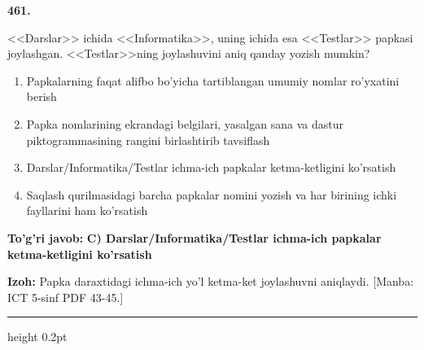 \documentclass[10pt,a4paper]{article}
\begin{document}
{\bfseries\sffamily\color{ink} 461.}
\par
<<Darslar>> ichida <<Informatika>>, uning ichida esa <<Testlar>> papkasi joylashgan. <<Testlar>>ning joylashuvini aniq qanday yozish mumkin?
\begin{enumerate}[label=\Alph*),leftmargin=9mm]
\item Papkalarning faqat alifbo bo'yicha tartiblangan umumiy nomlar ro'yxatini berish
\item Papka nomlarining ekrandagi belgilari, yasalgan sana va dastur piktogrammasining rangini birlashtirib tavsiflash
\item Darslar/Informatika/Testlar ichma-ich papkalar ketma-ketligini ko'rsatish
\item Saqlash qurilmasidagi barcha papkalar nomini yozish va har birining ichki fayllarini ham ko'rsatish
\end{enumerate}
\begin{tcolorbox}[enhanced,breakable,colback=teal!4,colframe=teal!60!black,boxrule=0.45pt,arc=1.2mm,left=2.7mm,right=2.7mm,top=1.8mm,bottom=1.8mm,before skip=2mm,after skip=2mm]
{\bfseries\sffamily\color{teal}To'g'ri javob:} \textbf{C) Darslar/Informatika/Testlar ichma-ich papkalar ketma-ketligini ko'rsatish}
\par\smallskip
{\bfseries Izoh:} Papka daraxtidagi ichma-ich yo'l ketma-ket joylashuvni aniqlaydi. [Manba: ICT 5-sinf PDF 43-45.]
\end{tcolorbox}
\vspace{2mm}\hrule height 0.2pt\vspace{3mm}
\end{document}
